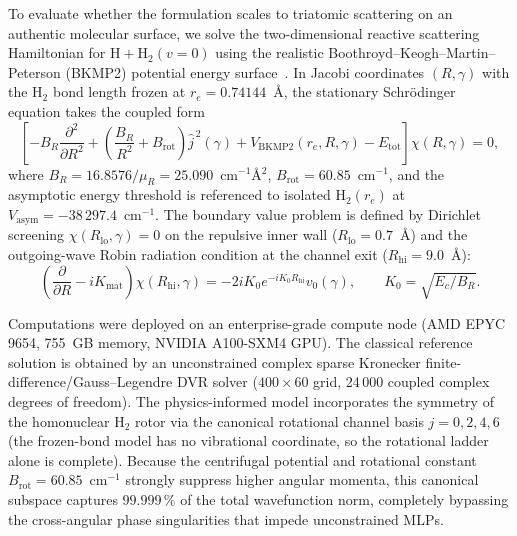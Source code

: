 \documentclass[11pt,a4paper]{article}
\newcommand{\cmi}{\ensuremath{\mathrm{cm}^{-1}}}
\begin{document}
To evaluate whether the formulation scales to triatomic scattering on an
authentic molecular surface, we solve the two-dimensional reactive scattering
Hamiltonian for $\mathrm{H} + \mathrm{H}_2(v=0)$ using the realistic
Boothroyd--Keogh--Martin--Peterson (BKMP2) potential energy
surface~\cite{boothroyd1996bkmp2}. In Jacobi coordinates $(R, \gamma)$ with the
$\mathrm{H}_2$ bond length frozen at $r_e = 0.74144$~\AA, the stationary
Schr\"odinger equation takes the coupled form
\begin{equation}
 \left[ -B_R \frac{\partial^2}{\partial R^2} + \left( \frac{B_R}{R^2} + B_{\mathrm{rot}} \right) \hat j^{\,2}(\gamma) + V_{\mathrm{BKMP2}}(r_e, R, \gamma) - E_{\mathrm{tot}} \right] \chi(R, \gamma) = 0,
\end{equation}
where $B_R = 16.8576 / \mu_R = 25.090$~\cmi{}\AA$^2$, $B_{\mathrm{rot}} = 60.85$~\cmi{},
and the asymptotic energy threshold is referenced to isolated $\mathrm{H}_2(r_e)$ at
$V_{\mathrm{asym}} = -38\,297.4$~\cmi{}. The boundary value problem is defined by
Dirichlet screening $\chi(R_{\mathrm{lo}}, \gamma) = 0$ on the repulsive inner wall
($R_{\mathrm{lo}} = 0.7$~\AA) and the outgoing-wave Robin radiation condition at the
channel exit ($R_{\mathrm{hi}} = 9.0$~\AA):
\begin{equation}
 \left( \frac{\partial}{\partial R} - i K_{\mathrm{mat}} \right) \chi(R_{\mathrm{hi}}, \gamma) = -2 i K_0 e^{-i K_0 R_{\mathrm{hi}}} v_0(\gamma) , \qquad K_0 = \sqrt{E_c / B_R} .
\end{equation}

Computations were deployed on an enterprise-grade compute node (AMD EPYC 9654, 755~GB memory,
NVIDIA A100-SXM4 GPU). The classical reference solution is obtained by an unconstrained
complex sparse Kronecker finite-difference/Gauss--Legendre DVR solver ($400 \times 60$ grid,
24\,000 coupled complex degrees of freedom).
The physics-informed model incorporates the symmetry of the homonuclear $\mathrm{H}_2$ rotor
via the canonical rotational channel basis $j=0, 2, 4, 6$ (the frozen-bond model
has no vibrational coordinate, so the rotational ladder alone is complete).
Because the centrifugal potential and rotational constant $B_{\mathrm{rot}} = 60.85$~\cmi{}
strongly suppress higher angular momenta, this canonical subspace captures $99.999\,\%$
of the total wavefunction norm, completely bypassing the cross-angular phase singularities
that impede unconstrained MLPs.
\end{document}
